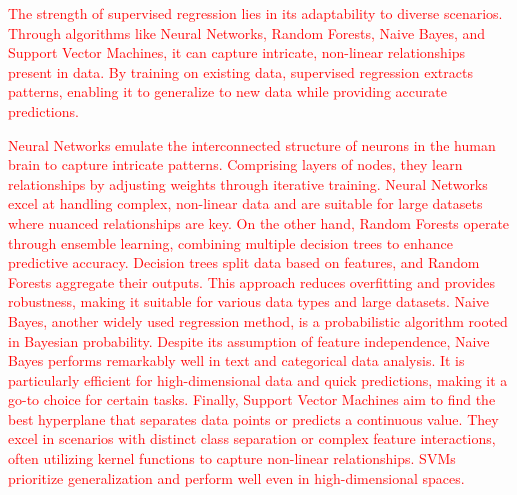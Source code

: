 \documentclass[12pt]{iopart}
\begin{document}
\textcolor{red}{The strength of supervised regression lies in its adaptability to diverse scenarios. Through algorithms like Neural Networks, Random Forests, Naive Bayes, and Support Vector Machines, it can capture intricate, non-linear relationships present in data. By training on existing data, supervised regression extracts patterns, enabling it to generalize to new data while providing accurate predictions.}

\textcolor{red}{Neural Networks emulate the interconnected structure of neurons in the human brain to capture intricate patterns. Comprising layers of nodes, they learn relationships by adjusting weights through iterative training. Neural Networks excel at handling complex, non-linear data and are suitable for large datasets where nuanced relationships are key. On the other hand, Random Forests operate through ensemble learning, combining multiple decision trees to enhance predictive accuracy. Decision trees split data based on features, and Random Forests aggregate their outputs. This approach reduces overfitting and provides robustness, making it suitable for various data types and large datasets. Naive Bayes, another widely used regression method, is a probabilistic algorithm rooted in Bayesian probability. Despite its assumption of feature independence, Naive Bayes performs remarkably well in text and categorical data analysis. It is particularly efficient for high-dimensional data and quick predictions, making it a go-to choice for certain tasks. Finally, Support Vector Machines aim to find the best hyperplane that separates data points or predicts a continuous value. They excel in scenarios with distinct class separation or complex feature interactions, often utilizing kernel functions to capture non-linear relationships. SVMs prioritize generalization and perform well even in high-dimensional spaces.}
\end{document}
